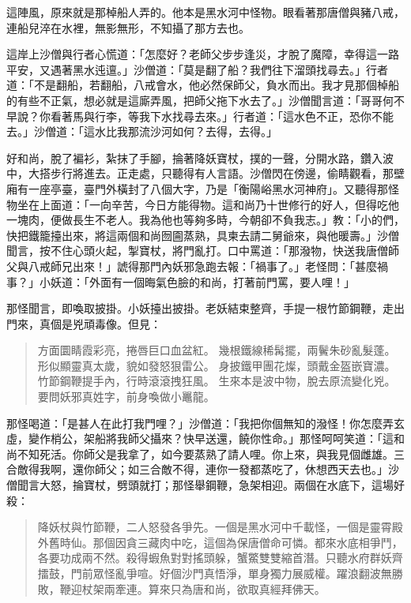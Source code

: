 這陣風，原來就是那棹船人弄的。他本是黑水河中怪物。眼看著那唐僧與豬八戒，連船兒淬在水裡，無影無形，不知攝了那方去也。

這岸上沙僧與行者心慌道：「怎麼好？老師父步步逢災，才脫了魔障，幸得這一路平安，又遇著黑水迍邅。」沙僧道：「莫是翻了船？我們往下溜頭找尋去。」行者道：「不是翻船，若翻船，八戒會水，他必然保師父，負水而出。我才見那個棹船的有些不正氣，想必就是這廝弄風，把師父拖下水去了。」沙僧聞言道：「哥哥何不早說？你看著馬與行李，等我下水找尋去來。」行者道：「這水色不正，恐你不能去。」沙僧道：「這水比我那流沙河如何？去得，去得。」

好和尚，脫了褊衫，紮抹了手腳，掄著降妖寶杖，撲的一聲，分開水路，鑽入波中，大搭步行將進去。正走處，只聽得有人言語。沙僧閃在傍邊，偷睛觀看，那壁廂有一座亭臺，臺門外橫封了八個大字，乃是「衡陽峪黑水河神府」。又聽得那怪物坐在上面道：「一向辛苦，今日方能得物。這和尚乃十世修行的好人，但得吃他一塊肉，便做長生不老人。我為他也等夠多時，今朝卻不負我志。」教：「小的們，快把鐵籠擡出來，將這兩個和尚囫圇蒸熟，具柬去請二舅爺來，與他暖壽。」沙僧聞言，按不住心頭火起，掣寶杖，將門亂打。口中罵道：「那潑物，快送我唐僧師父與八戒師兄出來！」諕得那門內妖邪急跑去報：「禍事了。」老怪問：「甚麼禍事？」小妖道：「外面有一個晦氣色臉的和尚，打著前門罵，要人哩！」

那怪聞言，即喚取披掛。小妖擡出披掛。老妖結束整齊，手提一根竹節鋼鞭，走出門來，真個是兇頑毒像。但見：
\begin{quote}
方面圜睛霞彩亮，捲唇巨口血盆紅。
幾根鐵線稀髯擺，兩鬢朱砂亂髮蓬。
形似顯靈真太歲，貌如發怒狠雷公。
身披鐵甲團花燦，頭戴金盔嵌寶濃。
竹節鋼鞭提手內，行時滾滾拽狂風。
生來本是波中物，脫去原流變化兇。
要問妖邪真姓字，前身喚做小鼉龍。
\end{quote}

那怪喝道：「是甚人在此打我門哩？」沙僧道：「我把你個無知的潑怪！你怎麼弄玄虛，變作梢公，架船將我師父攝來？快早送還，饒你性命。」那怪呵呵笑道：「這和尚不知死活。你師父是我拿了，如今要蒸熟了請人哩。你上來，與我見個雌雄。三合敵得我啊，還你師父；如三合敵不得，連你一發都蒸吃了，休想西天去也。」沙僧聞言大怒，掄寶杖，劈頭就打；那怪舉鋼鞭，急架相迎。兩個在水底下，這場好殺：
\begin{quote}
降妖杖與竹節鞭，二人怒發各爭先。一個是黑水河中千載怪，一個是靈霄殿外舊時仙。那個因貪三藏肉中吃，這個為保唐僧命可憐。都來水底相爭鬥，各要功成兩不然。殺得蝦魚對對搖頭躲，蟹鱉雙雙縮首潛。只聽水府群妖齊擂鼓，門前眾怪亂爭喧。好個沙門真悟淨，單身獨力展威權。躍浪翻波無勝敗，鞭迎杖架兩牽連。算來只為唐和尚，欲取真經拜佛天。
\end{quote}

